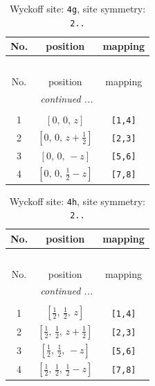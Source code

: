 \documentclass[fleqn,8pt]{jsarticle}
\begin{document}
\begin{longtable}{ccc}
\caption{Wyckoff site: {\tt 4g}, site symmetry: {\tt 2..}}
 \\
 \hline \hline
No. & position & mapping \\ \hline \endfirsthead

\multicolumn{2}{l}{\tablename\ \thetable{}} \\
 \hline \hline
No. & position & mapping \\ \hline \endhead

 \hline \hline
\multicolumn{2}{r}{\footnotesize\it continued ...} \\ \endfoot

 \hline \hline
\multicolumn{2}{r}{} \\ \endlastfoot

1 & $\left[ 0,\, 0,\, z \right]$ & {\tt [1,4]} \\ \hline
2 & $\left[ 0,\, 0,\, z + \frac{1}{2} \right]$ & {\tt [2,3]} \\ \hline
3 & $\left[ 0,\, 0,\, - z \right]$ & {\tt [5,6]} \\ \hline
4 & $\left[ 0,\, 0,\, \frac{1}{2} - z \right]$ & {\tt [7,8]} \\
\end{longtable}
\renewcommand{\arraystretch}{1.2}
\begin{longtable}{ccc}
\caption{Wyckoff site: {\tt 4h}, site symmetry: {\tt 2..}}
 \\
 \hline \hline
No. & position & mapping \\ \hline \endfirsthead

\multicolumn{2}{l}{\tablename\ \thetable{}} \\
 \hline \hline
No. & position & mapping \\ \hline \endhead

 \hline \hline
\multicolumn{2}{r}{\footnotesize\it continued ...} \\ \endfoot

 \hline \hline
\multicolumn{2}{r}{} \\ \endlastfoot

1 & $\left[ \frac{1}{2},\, \frac{1}{2},\, z \right]$ & {\tt [1,4]} \\ \hline
2 & $\left[ \frac{1}{2},\, \frac{1}{2},\, z + \frac{1}{2} \right]$ & {\tt [2,3]} \\ \hline
3 & $\left[ \frac{1}{2},\, \frac{1}{2},\, - z \right]$ & {\tt [5,6]} \\ \hline
4 & $\left[ \frac{1}{2},\, \frac{1}{2},\, \frac{1}{2} - z \right]$ & {\tt [7,8]} \\
\end{longtable}
\end{document}
